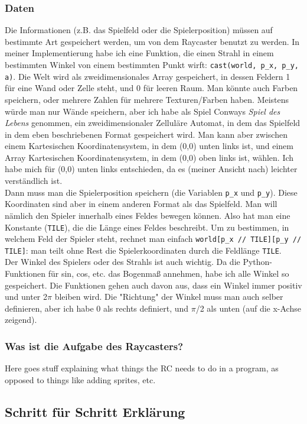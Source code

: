 \documentclass[a4paper,12pt]{report}
\begin{document}
\subsubsection{Daten}
Die Informationen (z.B. das Spielfeld oder die Spielerposition) müssen auf bestimmte Art gespeichert werden, um von dem Raycaster benutzt zu werden. In meiner Implementierung habe ich eine Funktion, die einen Strahl in einem bestimmten Winkel von einem bestimmten Punkt wirft: \texttt{cast(world, p\_x, p\_y, a)}. Die Welt wird als zweidimensionales Array gespeichert, in dessen Feldern 1 für eine Wand oder Zelle steht, und 0 für leeren Raum. Man könnte auch Farben speichern, oder mehrere Zahlen für mehrere Texturen/Farben haben. Meistens würde man nur Wände speichern, aber ich habe als Spiel Conways \textit{Spiel des Lebens} genommen, ein zweidimensionaler Zelluläre Automat, in dem das Spielfeld in dem eben beschriebenen Format gespeichert wird. Man kann aber zwischen einem Kartesischen Koordinatensystem, in dem (0,0) unten links ist, und einem Array Kartesischen Koordinatensystem, in dem (0,0) oben links ist, wählen. Ich habe mich für (0,0) unten links entschieden, da es (meiner Ansicht nach) leichter verständlich ist. \\
Dann muss man die Spielerposition speichern (die Variablen \texttt{p\_x} und \texttt{p\_y}). Diese Koordinaten sind aber in einem anderen Format als das Spielfeld. Man will nämlich den Spieler innerhalb eines Feldes bewegen können. Also hat man eine Konstante (\texttt{TILE}), die die Länge eines Feldes beschreibt. Um zu bestimmen, in welchem Feld der Spieler steht, rechnet man einfach \texttt{world[p\_x // TILE][p\_y // TILE]}: man teilt ohne Rest die Spielerkoordinaten durch die Feldlänge \texttt{TILE}. \\
Der Winkel des Spielers oder des Strahls ist auch wichtig. Da die Python-Funktionen für sin, cos, etc. das Bogenmaß annehmen, habe ich alle Winkel so gespeichert. Die Funktionen gehen auch davon aus, dass ein Winkel immer positiv und unter 2$\pi$ bleiben wird. Die "Richtung" der Winkel muss man auch selber definieren, aber ich habe 0 als rechts definiert, und $\pi$/2 als unten (auf die x-Achse zeigend).
\subsubsection{Was ist die Aufgabe des Raycasters?}
Here goes stuff explaining what things the RC needs to do in a program, as opposed to things like adding sprites, etc.

\subsection{Schritt für Schritt Erklärung}
\end{document}
